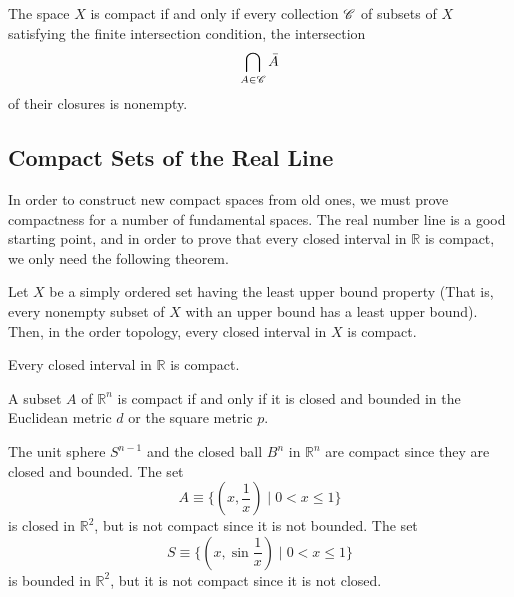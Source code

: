     \begin{corollary}
      The space $X$ is compact if and only if every collection $\operatorname{\mathscr{C}}$ of subsets of $X$ satisfying the finite intersection condition, the intersection 
      \begin{equation}
        \bigcap_{A \in \operatorname{\mathscr{C}}} \bar{A}
      \end{equation}
      of their closures is nonempty. 
    \end{corollary}

  \subsection{Compact Sets of the Real Line}

    In order to construct new compact spaces from old ones, we must prove compactness for a number of fundamental spaces. The real number line is a good starting point, and in order to prove that every closed interval in $\mathbb{R}$ is compact, we only need the following theorem. 

    \begin{theorem}
      Let $X$ be a simply ordered set having the least upper bound property (That is, every nonempty subset of $X$ with an upper bound has a least upper bound). Then, in the order topology, every closed interval in $X$ is compact. 
    \end{theorem}

    \begin{corollary}
      Every closed interval in $\mathbb{R}$ is compact. 
    \end{corollary}

    \begin{theorem}
      A subset $A$ of $\mathbb{R}^n$ is compact if and only if it is closed and bounded in the Euclidean metric $d$ or the square metric $p$. 
    \end{theorem}

    \begin{example}
      The unit sphere $S^{n-1}$ and the closed ball $B^n$ in $\mathbb{R}^n$ are compact since they are closed and bounded. The set
      \begin{equation}
        A \equiv \{(x, \frac{1}{x}) \; | \; 0 < x \leq 1\}
      \end{equation}
      is closed in $\mathbb{R}^2$, but is not compact since it is not bounded. The set 
      \begin{equation}
        S \equiv \{(x, \sin{\frac{1}{x}}) \; | \; 0<x\leq 1\}
      \end{equation}
      is bounded in $\mathbb{R}^2$, but it is not compact since it is not closed. 
    \end{example}

